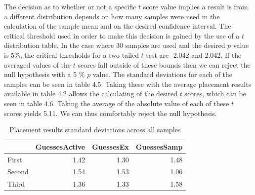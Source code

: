 The decision as to whether or not a specific $t$ score value implies a result
is from a different distribution depends on how many samples were used in the
calculation of the sample mean and on the desired confidence interval.
The critical threshold used in order to make this decision is gained by the use
of a $t$ distribution table. In the case where 30 samples are used and the desired
$p$  value is 5\%, the critical thresholds for a two-tailed $t$ test are -2.042 and 2.042. If the averaged
values of the $t$ scores fall outside of these bounds then we can reject the null
hypothesis with a 5 \% $p$ value. The standard deviations for each of the samples
can be seen in table 4.5. Taking these with the average placement results available in
table 4.2 allows the calculating of the desired $t$ scores, which can be seen in
table 4.6. Taking the average of the absolute value of each of these $t$ scores
yields 5.11. We can thus comfortably reject the null hypothesis.

\begin{table}
\begin{tabular}{lrrr}
\toprule
{} &  GuessesActive &  GuessesEx &  GuessesSamp \\
\midrule
First  &           1.42 &       1.30 &     1.48 \\
Second &           1.54 &       1.53 &     1.06 \\
Third  &           1.36 &       1.33 &     1.58 \\
\bottomrule
\end{tabular}
\caption{Placement results standard deviations across all samples}
\end{table}


